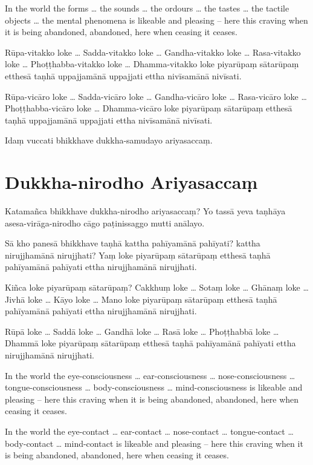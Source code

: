 In the world the forms \ldots{} the sounds \ldots{} the ordours \ldots{} the
tastes \ldots{} the tactile objects \ldots{} the mental phenomena is likeable
and pleasing -- here this craving when it is being abandoned, abandoned, here
when ceasing it ceases.

\paliPage

Rūpa-vitakko loke \ldots{} Sadda-vitakko loke \ldots{} Gandha-vitakko loke \ldots{}
Rasa-vitakko loke \ldots{} Phoṭṭhabba-vitakko loke \ldots{} Dhamma-vitakko loke
piyarūpaṃ sātarūpaṃ etthesā taṇhā uppajjamānā uppajjati ettha nivīsamānā
nivīsati.

Rūpa-vicāro loke \ldots{} Sadda-vicāro loke \ldots{} Gandha-vicāro loke \ldots{}
Rasa-vicāro loke \ldots{} Phoṭṭhabba-vicāro loke \ldots{} Dhamma-vicāro loke
piyarūpaṃ sātarūpaṃ etthesā taṇhā uppajjamānā uppajjati ettha nivīsamānā
nivīsati.

Idaṃ vuccati bhikkhave dukkha-samudayo ariyasaccaṃ.

\section*{Dukkha-nirodho Ariyasaccaṃ}

Katamañca bhikkhave dukkha-nirodho ariyasaccaṃ? Yo tassā yeva taṇhāya
asesa-virāga-nirodho cāgo paṭinissaggo mutti anālayo.

Sā kho panesā bhikkhave taṇhā kattha pahīyamānā pahīyati? kattha nirujjhamānā
nirujjhati? Yaṃ loke piyarūpaṃ sātarūpaṃ etthesā taṇhā pahīyamānā pahīyati ettha
nirujjhamānā nirujjhati.

Kiñca loke piyarūpaṃ sātarūpaṃ? Cakkhuṃ loke \ldots{} Sotaṃ loke \ldots{} Ghānaṃ
loke \ldots{} Jivhā loke \ldots{} Kāyo loke \ldots{} Mano loke piyarūpaṃ
sātarūpaṃ etthesā taṇhā pahīyamānā pahīyati ettha nirujjhamānā nirujjhati.

Rūpā loke \ldots{} Saddā loke \ldots{} Gandhā loke \ldots{} Rasā loke \ldots{}
Phoṭṭhabbā loke \ldots{} Dhammā loke piyarūpaṃ sātarūpaṃ etthesā taṇhā
pahīyamānā pahīyati ettha nirujjhamānā nirujjhati.

\englishPage

In the world the eye-consciousness \ldots{} ear-consciousness \ldots{}
nose-consciousness \ldots{} tongue-consciousness \ldots{} body-consciousness
\ldots{} mind-consciousness is likeable and pleasing -- here this craving when
it is being abandoned, abandoned, here when ceasing it ceases.

In the world the eye-contact \ldots{} ear-contact \ldots{} nose-contact \ldots{}
tongue-contact \ldots{} body-contact \ldots{} mind-contact is likeable and
pleasing -- here this craving when it is being abandoned, abandoned, here when
ceasing it ceases.

